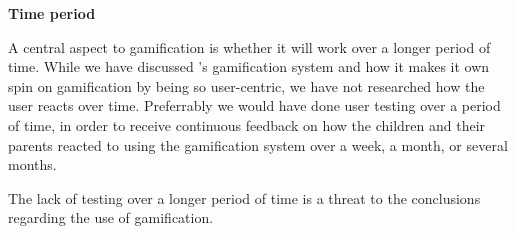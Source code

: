 \clearpage{}

\textbf{Time period}

A central aspect to gamification is whether it will work over a longer period of time. While we have discussed \app{}'s gamification system and how it makes it own spin on gamification by being so user-centric, we have not researched how the user reacts over time. Preferrably we would have done user testing over a period of time, in order to receive continuous feedback on how the children and their parents reacted to using the gamification system over a week, a month, or several months. 

The lack of testing over a longer period of time is a threat to the conclusions regarding the use of gamification. 

